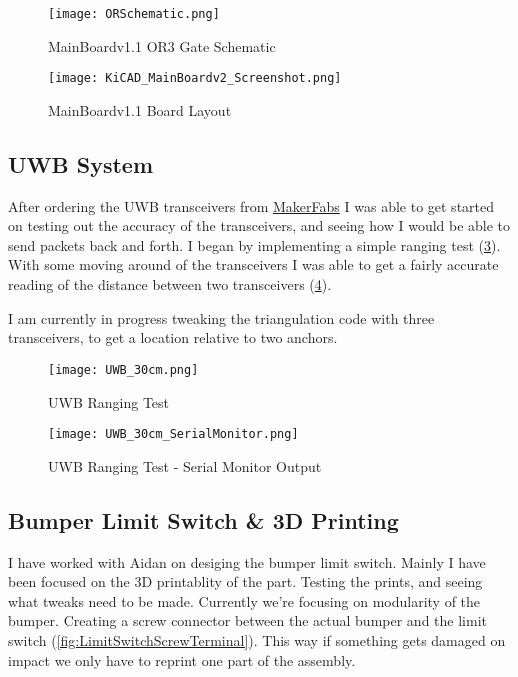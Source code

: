 \documentclass{report}
\begin{document}
    \begin{figure}[ht!]
        \centering
        \texttt{[image: ORSchematic.png]}
        \caption{MainBoardv1.1 OR3 Gate Schematic}
        \label{fig:ORSchematic}
    \end{figure}

    \begin{figure}[ht!]
        \centering
        \texttt{[image: KiCAD\_MainBoardv2\_Screenshot.png]}
        \caption{MainBoardv1.1 Board Layout}
        \label{fig:MainBoardv1.1_Layout}
    \end{figure}
    
    \subsection{UWB System}
    After ordering the UWB transceivers from \href{https://www.makerfabs.com/esp32-uwb-dw3000.html}{MakerFabs} I was able to get started on testing out the accuracy of the transceivers, and seeing how I would be able to send packets back and forth. I began by implementing a simple ranging test (\ref{fig:UWBRanging}). With some moving around of the transceivers I was able to get a fairly accurate reading of the distance between two transceivers (\ref{fig:UWBRangingSerialMonitor}).

    I am currently in progress tweaking the triangulation code with three transceivers, to get a location relative to two anchors.

    \begin{figure}[ht!]
        \centering
        \texttt{[image: UWB\_30cm.png]}
        \caption{UWB Ranging Test}
        \label{fig:UWBRanging}
    \end{figure}

    \begin{figure}[ht!]
        \centering
        \texttt{[image: UWB\_30cm\_SerialMonitor.png]}
        \caption{UWB Ranging Test - Serial Monitor Output}
        \label{fig:UWBRangingSerialMonitor}
    \end{figure}

    \subsection{Bumper Limit Switch \& 3D Printing}

    I have worked with Aidan on desiging the bumper limit switch. Mainly I have been focused on the 3D printablity of the part. Testing the prints, and seeing what tweaks need to be made. Currently we're focusing on modularity of the bumper. Creating a screw connector between the actual bumper and the limit switch (\ref{fig:LimitSwitchScrewTerminal}). This way if something gets damaged on impact we only have to reprint one part of the assembly.
\end{document}
